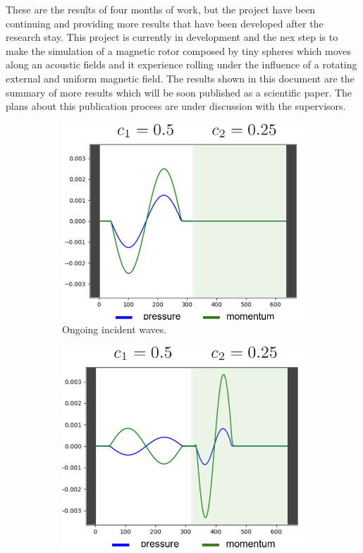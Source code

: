 These are the results of four months of work, but the project have been continuing and providing more results that have been developed after the research stay. This project is currently in development and the nex step is to make the simulation of a magnetic rotor composed by tiny spheres which moves along an acoustic fields and it experience rolling under the influence of a rotating external and uniform magnetic field. The results shown in this document are the summary of more results which will be soon published as a scientific paper. The plans about this publication process are under discussion with the supervisors.
\begin{figure}
    \begin{subfigure}{0.35\textwidth}
    \centering
    \includegraphics[width=\textwidth]{images/Results/InterphaseInitial.PNG}
    \caption{Ongoing incident waves.}
    \label{fig:interphase_init}
    \end{subfigure}
    \begin{subfigure}{0.34\textwidth}
    \centering
    \includegraphics[width=\textwidth]{images/Results/InterphaseFinal.PNG}

\end{subfigure}
\end{figure}
